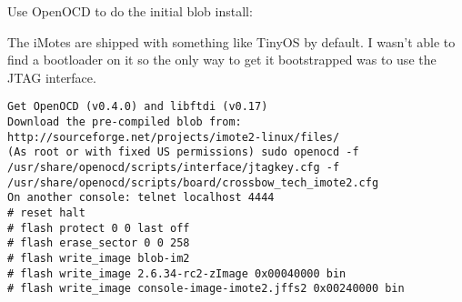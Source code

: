 Use OpenOCD to do the initial blob install:

The iMotes are shipped with something like TinyOS by default. I wasn't able to
find a bootloader on it so the only way to get it bootstrapped was to use the
JTAG interface.

\begin{verbatim}
Get OpenOCD (v0.4.0) and libftdi (v0.17)
Download the pre-compiled blob from: http://sourceforge.net/projects/imote2-linux/files/
(As root or with fixed US permissions) sudo openocd -f /usr/share/openocd/scripts/interface/jtagkey.cfg -f /usr/share/openocd/scripts/board/crossbow_tech_imote2.cfg
On another console: telnet localhost 4444
# reset halt
# flash protect 0 0 last off
# flash erase_sector 0 0 258
# flash write_image blob-im2
# flash write_image 2.6.34-rc2-zImage 0x00040000 bin
# flash write_image console-image-imote2.jffs2 0x00240000 bin
\end{verbatim}
